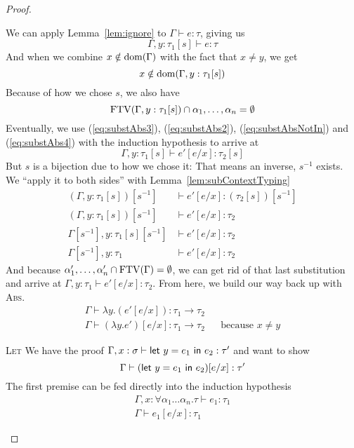 \begin{proof}
\begin{description}
    We can apply Lemma~\ref{lem:ignore} to $\Gamma \vdash e : \tau$, giving us
    \begin{equation}
      \Gamma , y : \tau_1[s] \vdash e : \tau\label{eq:substAbs3}
    \end{equation}
    And when we combine $x \notin \operatorname{dom}(\Gamma)$ with the fact that $x \ne y$, we get
    \begin{equation}
      x \notin \operatorname{dom}(\Gamma , y : \tau_1[s])
      \label{eq:substAbsNotIn}
    \end{equation}
    Because of how we chose $s$, we also have
    \begin{equation}
      \operatorname{FTV}(\Gamma, y : \tau_1[s]) \cap {\alpha_1,\ldots,\alpha_n} = \emptyset\label{eq:substAbs4}
    \end{equation}
    Eventually, we use (\ref{eq:substAbs3}), (\ref{eq:substAbs2}),
    (\ref{eq:substAbsNotIn}) and (\ref{eq:substAbs4}) with the
    induction hypothesis to arrive at
    \[ \Gamma , y : \tau_1[s] \vdash e' [e/x] : \tau_2[s] \]
    But $s$ is a bijection due to how we chose it: That means an
    inverse, $s^{-1}$ exists. We ``apply it to both sides'' with
    Lemma~\ref{lem:subContextTyping}
    \begin{align*}
      (\Gamma , y : \tau_1[s])[s^{-1}] &\vdash e' [e/x] : (\tau_2[s])[s^{-1}] \\
      (\Gamma , y : \tau_1[s])[s^{-1}] &\vdash e' [e/x] : \tau_2 \\
      \Gamma[s^{-1}] , y : \tau_1[s][s^{-1}] &\vdash e' [e/x] : \tau_2 \\
      \Gamma[s^{-1}], y : \tau_1 &\vdash e' [e/x] : \tau_2
    \end{align*}
    And because $\alpha'_1 , \ldots, \alpha'_n \cap \operatorname{FTV}(\Gamma) = \emptyset$, we can get rid of that
    last substitution and arrive at ${\Gamma, y : \tau_1 \vdash e' [e/x] : \tau_2}$.
    From here, we build our way back up with \textsc{Abs}.
    \begin{align*}
      \Gamma \vdash \lambda y . (e' [e/x]) : \tau_1 \rightarrow \tau_2 \\
      \Gamma \vdash (\lambda y . e')[e/x] : \tau_1 \rightarrow \tau_2 && \text{because } x \ne y
    \end{align*}
    
  \item{\rm\textsc{Let}} We have the proof ${\Gamma , x : \sigma \vdash \mathsf{let} \ y = e_1 \ \mathsf{in} \ e_2 :
      \tau'}$
    and want to show
    \[\Gamma \vdash (\mathsf{let} \ y = e_1 \ \mathsf{in} \ e_2)[e/x] : \tau'\]
    The first premise can be fed directly into the induction hypothesis
    \begin{align}
      \Gamma , x : \forall \alpha_1\ldots\alpha_n . \tau \vdash e_1 : \tau_1 \nonumber \\
      \Gamma \vdash e_1 [e / x] : \tau_1 \label{eq:substLet7}
    \end{align}


\end{description}
\end{proof}
